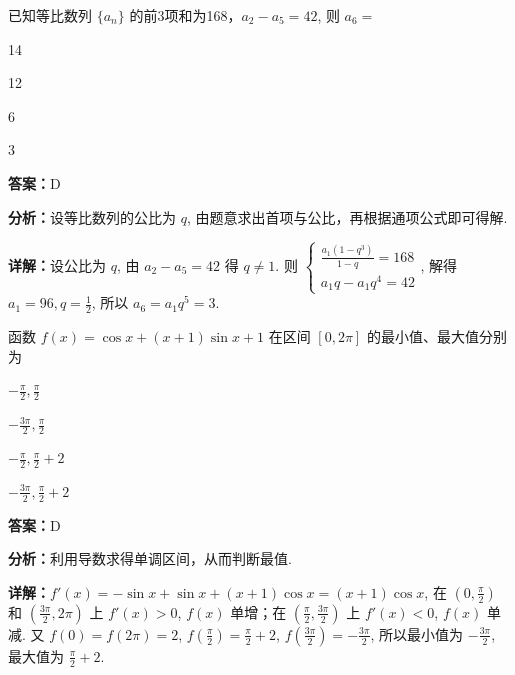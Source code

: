 \begin{question}[points=5]
已知等比数列 $\{a_n\}$ 的前3项和为168，$a_2 - a_5 = 42$, 则 $a_6 =$
\begin{choices}
  \item 14
  \item 12
  \item 6
  \item 3
\end{choices}
\begin{solution}
\textbf{答案：}D

\textbf{分析：}设等比数列的公比为 $q$, 由题意求出首项与公比，再根据通项公式即可得解.

\textbf{详解：}设公比为 $q$, 由 $a_2-a_5=42$ 得 $q\neq1$. 则 $\begin{cases} \frac{a_1(1-q^3)}{1-q}=168 \\ a_1q - a_1q^4 = 42 \end{cases}$, 解得 $a_1=96, q=\frac12$, 所以 $a_6 = a_1q^5 = 3$.
\end{solution}
\end{question}

\begin{question}[points=5]
函数 $f(x) = \cos x + (x+1)\sin x + 1$ 在区间 $[0, 2\pi]$ 的最小值、最大值分别为
\begin{choices}
  \item $-\frac{\pi}{2}, \frac{\pi}{2}$
  \item $-\frac{3\pi}{2}, \frac{\pi}{2}$
  \item $-\frac{\pi}{2}, \frac{\pi}{2}+2$
  \item $-\frac{3\pi}{2}, \frac{\pi}{2}+2$
\end{choices}
\begin{solution}
\textbf{答案：}D

\textbf{分析：}利用导数求得单调区间，从而判断最值.

\textbf{详解：}$f'(x) = -\sin x + \sin x + (x+1)\cos x = (x+1)\cos x$, 在 $(0,\frac{\pi}{2})$ 和 $(\frac{3\pi}{2},2\pi)$ 上 $f'(x)>0$, $f(x)$ 单增；在 $(\frac{\pi}{2},\frac{3\pi}{2})$ 上 $f'(x)<0$, $f(x)$ 单减. 又 $f(0)=f(2\pi)=2$, $f(\frac{\pi}{2})=\frac{\pi}{2}+2$, $f(\frac{3\pi}{2}) = -\frac{3\pi}{2}$, 所以最小值为 $-\frac{3\pi}{2}$, 最大值为 $\frac{\pi}{2}+2$.
\end{solution}
\end{question}

